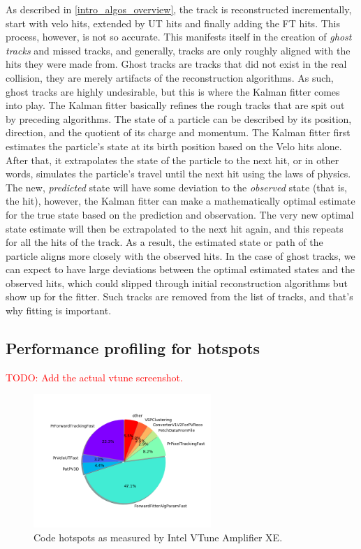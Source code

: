 \documentclass[12pt]{article}
\begin{document}
	As described in \ref{intro_algos_overview}, the track is reconstructed incrementally, start with velo hits, extended by UT hits and finally adding the FT hits. This process, however, is not so accurate. This manifests itself in the creation of \textit{ghost tracks} and missed tracks, and generally, tracks are only roughly aligned with the hits they were made from. Ghost tracks are tracks that did not exist in the real collision, they are merely artifacts of the reconstruction algorithms. As such, ghost tracks are highly undesirable, but this is where the Kalman fitter comes into play. 
	The Kalman fitter basically refines the rough tracks that are spit out by preceding algorithms. The state of a particle can be described by its position, direction, and the quotient of its charge and momentum. The Kalman fitter first estimates the particle's state at its birth position based on the Velo hits alone. After that, it extrapolates the state of the particle to the next hit, or in other words, simulates the particle's travel until the next hit using the laws of physics. The new, \textit{predicted} state will have some deviation to the \textit{observed} state (that is, the hit), however, the Kalman fitter can make a mathematically optimal estimate for the true state based on the prediction and observation. The very new optimal state estimate will then be extrapolated to the next hit again, and this repeats for all the hits of the track.
	As a result, the estimated state or path of the particle aligns more closely with the observed hits. In the case of ghost tracks, we can expect to have large deviations between the optimal estimated states and the observed hits, which could slipped through initial reconstruction algorithms but show up for the fitter. Such tracks are removed from the list of tracks, and that's why fitting is important.	
	
	\subsection{Performance profiling for hotspots}
	
	\textcolor{red}{TODO: Add the actual vtune screenshot.}
	\begin{figure}[H]
		\begin{center}
			\includegraphics[width=0.6\textwidth]{algo_usage_original_bestphys}
		\end{center}
		\caption{Code hotspots as measured by Intel VTune Amplifier XE.}
		\label{fig_kalman_vtune_initial}
	\end{figure}
	
\end{document}
